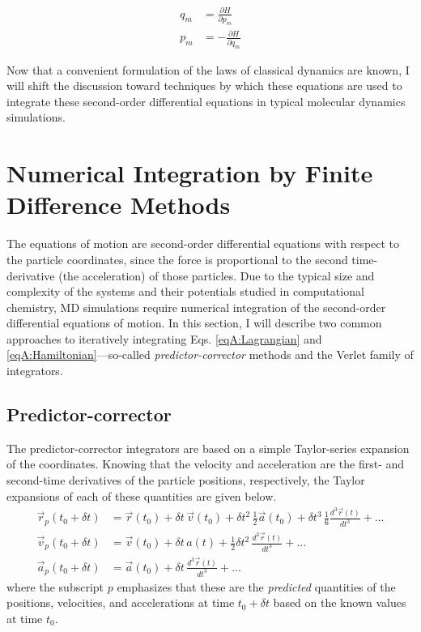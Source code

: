 \begin{align}
   q_m & = \frac {\partial H} {\partial p_m} \nonumber \\
   p_m & = - \frac {\partial H} {\partial q_m}
   \label{eqA:Hamiltonian}
\end{align}

Now that a convenient formulation of the laws of classical dynamics are known, I
will shift the discussion toward techniques by which these equations are used to
integrate these second-order differential equations in typical molecular
dynamics simulations.

\section{Numerical Integration by Finite Difference Methods}

The equations of motion are second-order differential equations with respect to
the particle coordinates, since the force is proportional to the second
time-derivative (\ie the acceleration) of those particles. Due to the typical
size and complexity of the systems and their potentials studied in computational
chemistry, MD simulations require numerical integration of the second-order
differential equations of motion. In this section, I will describe two common
approaches to iteratively integrating Eqs. \ref{eqA:Lagrangian} and
\ref{eqA:Hamiltonian}---so-called \emph{predictor-corrector} methods and the
Verlet family of integrators.

\subsection{Predictor-corrector}

The predictor-corrector integrators are based on a simple Taylor-series
expansion of the coordinates. Knowing that the velocity and acceleration are the
first- and second-time derivatives of the particle positions, respectively, the
Taylor expansions of each of these quantities are given below.
\begin{align}
   \vec{r}_p (t_0 + \delta t) & = \vec{r}(t_0) + \delta t \, \vec{v}(t_0) +
         \delta t^2 \, \frac 1 2 \vec{a}(t_0) + \delta t^3 \, \frac 1 6 \frac
         {d^3\vec{r}(t)} {dt^3} + ... \nonumber \\
   \vec{v}_p (t_0 + \delta t) & = \vec{v}(t_0) + \delta t \, a(t) + \frac 1 2 
         \delta t^2 \, \frac {d^3\vec{r}(t)} {dt^3} + ...
   \label{eqA:Predictor} \\
   \vec{a}_p (t_0 + \delta t) & = \vec{a}(t_0) + \delta t \, \frac
         {d^3\vec{r}(t)} {dt^3} + ... \nonumber
\end{align}
where the subscript $p$ emphasizes that these are the \emph{predicted}
quantities of the positions, velocities, and accelerations at time $t_0 + \delta
t$ based on the known values at time $t_0$.

